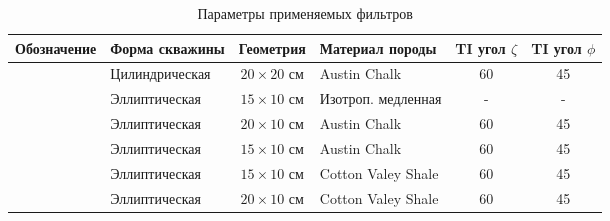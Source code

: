 
\begin{table}
\footnotesize
\centering
\caption{Параметры применяемых фильтров}
\renewcommand{\arraystretch}{1.5}
\begin{tabularx}{\textwidth}{|C|l|c|l|c|c|}
\hline  Обозначение & Форма скважины & Геометрия & Материал породы & TI угол $\zeta$ & TI угол $\phi$ \\ \hline
\hline \textbf{}\modelnum{\label{mnum: 1}}& Цилиндрическая & $20 \times 20$ см & Austin Chalk & 60 & 45 \\ 
\hline \textbf{}\modelnum{\label{mnum: 2}}& Эллиптическая & $15 \times 10$ см & Изотроп. медленная & - & - \\ 
\hline \textbf{}\modelnum{\label{mnum: 3}}& Эллиптическая & $20 \times 10$ см & Austin Chalk & 60 & 45 \\ 
\hline \textbf{}\modelnum{\label{mnum: 4}}& Эллиптическая & $15 \times 10$ см & Austin Chalk & 60 & 45 \\ 
\hline \textbf{}\modelnum{\label{mnum: 5}}& Эллиптическая & $15 \times 10$ см & Cotton Valey Shale & 60 & 45 \\ 
\hline \textbf{}\modelnum{\label{mnum: 6}}& Эллиптическая & $20 \times 10$ см & Cotton Valey Shale & 60 & 45 \\ 
\hline 
\end{tabularx}
\renewcommand{\arraystretch}{1.0}
\end{table}